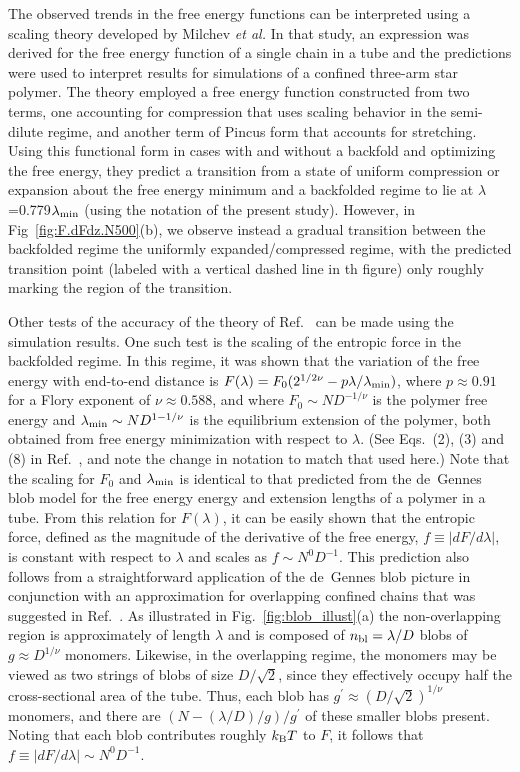 \documentclass[journal=mamobx,manuscript=article,layout=twocolumn]{achemso}
\begin{document}
The observed trends in the free energy functions can be interpreted using a scaling theory 
developed by Milchev {\it et al.}\cite{milchev2014arm} In that study, an expression was 
derived for the free energy function of a single chain in a tube and the predictions were used
to interpret results for simulations of a confined three-arm star polymer. The theory
employed a free energy function constructed from two terms, one accounting for compression
that uses scaling behavior in the semi-dilute regime, and another term of Pincus form
that accounts for stretching. Using this functional form in cases with and without a
backfold and optimizing the free energy, they predict a transition from a state of uniform 
compression or expansion about the free energy minimum and a backfolded regime to lie at 
$\lambda$=0.779$\lambda_{\rm min}$ (using the notation of the present study). However, 
in Fig~\ref{fig:F.dFdz.N500}(b), we observe instead a gradual transition between the 
backfolded regime the uniformly expanded/compressed regime, with the predicted transition
point (labeled with a vertical dashed line in th figure) only roughly marking the
region of the transition.

Other tests of the accuracy of the theory of Ref.~ can be made using
the simulation results. One such test is the scaling of the entropic force in the backfolded
regime. In this regime, it was shown that the variation of the free energy with end-to-end 
distance is $F(\lambda) = F_0 (2^{1/2\nu} - p \lambda / \lambda_{\rm min})$, where 
$p\approx 0.91$ for a Flory exponent of $\nu\approx 0.588$, and where $F_0\sim ND^{-1/\nu}$ 
is the polymer free energy and $\lambda_{\rm min}\sim ND^{1-1/\nu}$ is the equilibrium extension 
of the polymer, both obtained from free energy minimization with respect to $\lambda$. 
(See Eqs.~(2), (3) and (8) in Ref.~, and note the change in notation 
to match that used here.) Note that the scaling for $F_0$ and $\lambda_{\rm min}$ is identical
to that predicted from the de~Gennes blob model for the free energy energy and extension
lengths of a polymer in a tube.
From this relation for $F(\lambda)$, it can be easily shown that the entropic force, 
defined as the magnitude of the derivative of the free energy, $f\equiv |dF/d\lambda|$, 
is constant with respect to $\lambda$ and scales as $f \sim N^0 D^{-1}$. 
This prediction also follows from a straightforward application of the de~Gennes
blob picture in conjunction with an approximation for overlapping confined chains that was
suggested in Ref.~. As illustrated in Fig.~\ref{fig:blob_illust}(a)
the non-overlapping region is approximately of length $\lambda$ and is composed
of $n_{\rm bl}=\lambda/D$ blobs of $g\approx D^{1/\nu}$ monomers. Likewise, in the 
overlapping regime, the monomers may be viewed as two strings of blobs of size $D/\sqrt{2}$,
since they effectively occupy half the cross-sectional area of the tube.\cite{jung2012ring}
Thus, each blob has $g^\prime\approx (D/\sqrt{2})^{1/\nu}$ monomers, and there are 
$(N-(\lambda/D)/g)/g^\prime$ of these smaller blobs present. Noting that each blob contributes
roughly $k_{\rm B}T$ to $F$, it follows that $f \equiv |dF/d\lambda| \sim N^0 D^{-1}$.
\end{document}
